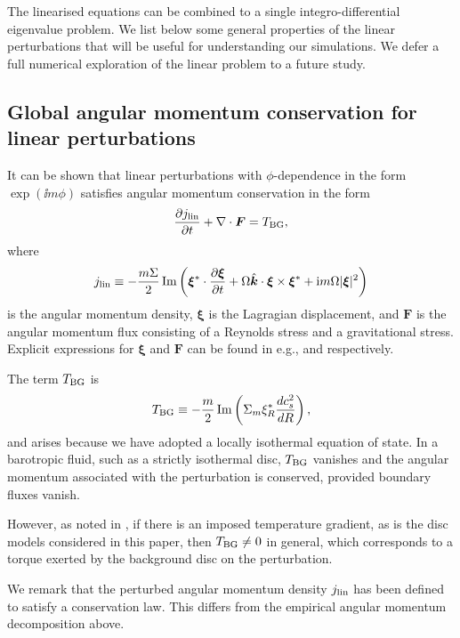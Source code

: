 The linearised equations can be combined to a single
integro-differential eigenvalue problem. We list below some general
properties of the linear perturbations that will be useful for
understanding our simulations. We defer a full numerical
exploration of the linear problem to a future study. 

\subsection{Global angular momentum conservation for linear
  perturbations} 
It can be shown that linear perturbations with $\phi$-dependence in the form
$\exp{(\ii m\phi)}$ satisfies angular momentum conservation
in the form 
\begin{align} 
  \frac{\partial j_\mathrm{lin}}{\partial t} + \nabla\cdot\bm{F} = T_\mathrm{BG}, 
\end{align}
where
\begin{align}\label{lin_ang_mom_cons}
  j_\mathrm{lin} \equiv
  -\frac{m\Sigma}{2}\operatorname{Im}\left(\bm{\xi}^*\cdot\frac{\partial\bm{\xi}}{\partial
      t} + \Omega \hat{\bm{k}}\cdot\bm{\xi}\times\bm{\xi}^* + \mathrm{i}
    m \Omega |\bm{\xi}|^2\right) 
\end{align}
is the angular momentum density, $\bm{\xi}$ is the Lagragian
displacement, and $\bm{F}$ is the angular momentum flux
consisting of a Reynolds stress and a gravitational stress. Explicit
expressions for $\bm{\xi}$ and $\bm{F}$ can be found in e.g.,
\cite{papaloizou85} and \cite{lin11} respectively.  

The term $T_\mathrm{BG}$ is 
\begin{align}\label{baroclinic_torque}
  T_\mathrm{BG} \equiv
  -\frac{m}{2}\operatorname{Im}\left(\Sigma_m\xi_R^*\frac{dc_s^2}{dR}\right), 
\end{align}
and arises because we have adopted a locally isothermal equation of
state. In a barotropic fluid, such as a strictly isothermal disc,
$T_\mathrm{BG}$ vanishes and the angular momentum associated with
the perturbation is conserved, provided boundary fluxes vanish. 

However, as noted in \cite{lin11}, if there is an imposed
temperature gradient, as is the disc models considered in this paper,
then $T_\mathrm{BG}\neq 0$ in general, which corresponds to a torque
exerted by the background disc on the perturbation.       

We remark that the perturbed angular momentum density $j_\mathrm{lin}$ has been
defined to satisfy a conservation law. This differs from the 
empirical angular momentum decomposition above. 


